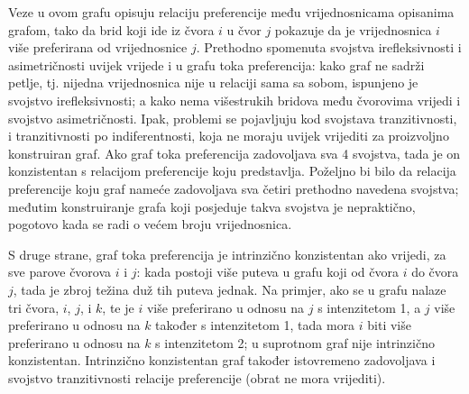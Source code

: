 \documentclass[lmodern, utf8, diplomski, numeric]{fer}
\begin{document}
  Veze u ovom grafu opisuju relaciju preferencije među vrijednosnicama opisanima grafom, tako da brid koji ide iz čvora $i$ u čvor $j$ pokazuje da je vrijednosnica $i$ više preferirana od vrijednosnice $j$.
  Prethodno spomenuta svojstva irefleksivnosti i asimetričnosti uvijek vrijede i u grafu toka preferencija:
  kako graf ne sadrži petlje, tj. nijedna vrijednosnica nije u relaciji sama sa sobom, ispunjeno je svojstvo irefleksivnosti; a kako nema višestrukih bridova među čvorovima vrijedi i svojstvo asimetričnosti.
  Ipak, problemi se pojavljuju kod svojstava tranzitivnosti, i tranzitivnosti po indiferentnosti, koja ne moraju uvijek vrijediti za proizvoljno konstruiran graf.
  Ako graf toka preferencija zadovoljava sva 4 svojstva, tada je on konzistentan s relacijom preferencije koju predstavlja.
  Poželjno bi bilo da relacija preferencije koju graf nameće zadovoljava sva četiri prethodno navedena svojstva; međutim konstruiranje grafa koji posjeduje takva svojstva je nepraktično, pogotovo kada se radi o većem broju vrijednosnica.
  
  S druge strane, graf toka preferencija je intrinzično konzistentan ako vrijedi, za sve parove čvorova $i$ i $j$: kada postoji više puteva u grafu koji od čvora $i$ do čvora $j$, tada je zbroj težina duž tih puteva jednak.
  Na primjer, ako se u grafu nalaze tri čvora, $i$, $j$, i $k$, te je $i$ više preferirano u odnosu na $j$ s intenzitetom 1, a $j$ više preferirano u odnosu na $k$ također s intenzitetom 1, tada mora $i$ biti više preferirano u odnosu na $k$ s intenzitetom 2; u suprotnom graf nije intrinzično konzistentan.
  Intrinzično konzistentan graf također istovremeno zadovoljava i svojstvo tranzitivnosti relacije preferencije (obrat ne mora vrijediti).
  
\end{document}
